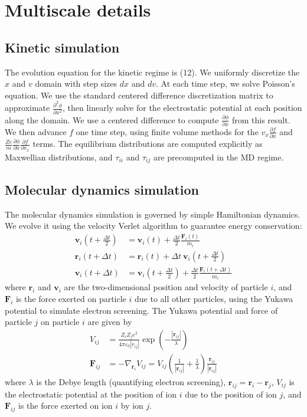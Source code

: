 \documentclass{article}
\begin{document}
\section{Multiscale details}

\subsection{Kinetic simulation}

The evolution equation for the kinetic regime is (12). We uniformly discretize the $x$ and $v$ domain with step sizes $dx$ and $dv$. At each time step, we solve Poisson's equation. We use the standard centered difference discretization matrix to approximate $\frac{\partial^2 \phi}{\partial x^2}$, then linearly solve for the electrostatic potential at each position along the domain. We use a centered difference to compute $\frac{\partial \phi}{\partial x}$ from this result. We then advance $f$ one time step, using finite volume methods for the $v_x\frac{\partial f}{\partial x}$ and $\frac{Ze}{m}\frac{\partial \phi}{\partial x}\frac{\partial f}{\partial v_x}$ terms. The equilibrium distributions are computed explicitly as Maxwellian distributions, and $\tau_{ii}$ and $\tau_{ij}$ are precomputed in the MD regime.

\subsection{Molecular dynamics simulation}
The molecular dynamics simulation is governed by simple Hamiltonian dynamics. We evolve it using the velocity Verlet algorithm to guarantee energy conservation:
\begin{align*}
\mathbf{v}_i\left(t+\frac{\Delta t}{2}\right)  	&= \mathbf{v}_i(t) + \frac{\Delta t}{2}\frac{\mathbf{F}_i(t)}{m_i} \\
\mathbf{r}_i(t+\Delta t) 		   		&= \mathbf{r}_i(t) + \Delta t\:\mathbf{v}_i\left(t+\frac{\Delta t}{2}\right) \\
\mathbf{v}_i(t+\Delta t)			  	&= \mathbf{v}_i\left(t+\frac{\Delta t}{2}\right) + 
								\frac{\Delta t}{2}\frac{\mathbf{F}_i(t+\Delta t)}{m_i}
\end{align*}
where $\mathbf{r}_i$ and $\mathbf{v}_i$ are the two-dimensional position and velocity of particle $i$, and $\mathbf{F}_i$ is the force exerted on particle $i$ due to all other particles, using the Yukawa potential to simulate electron screening. The Yukawa potential and force of particle $j$ on particle $i$ are given by
\begin{align*}
V_{ij}	&= \frac{Z_i Z_j e^2}{4 \pi \varepsilon_0 |r_{ij}|}\exp\left(-\frac{|\mathbf{r}_{ij}|}{\lambda}\right) \\
\mathbf{F}_{ij}	&= -\nabla_{\mathbf{r}_i}V_{ij} = V_{ij}\left(\frac{1}{|\mathbf{r}_{ij}|} + \frac{1}{\lambda}\right)\frac{\mathbf{r}_{ij}}{|\mathbf{r}_{ij}|}
\end{align*}
where $\lambda$ is the Debye length (quantifying electron screening), $\mathbf{r}_{ij} = \mathbf{r}_i - \mathbf{r}_j$, $V_{ij}$ is the electrostatic potential at the position of ion $i$ due to the position of ion $j$, and $\mathbf{F}_{ij}$ is the force exerted on ion $i$ by ion $j$.
\end{document}
